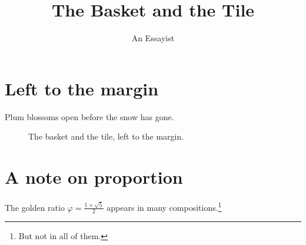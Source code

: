 \documentclass[11pt,a4paper]{article}
\title{The Basket and the Tile}
\author{An Essayist}
\date{}
\providecommand\KachoSprayCmd{}
\begin{document}
\maketitle
\section{Left to the margin}
Plum blossoms open before the snow has gone. \lipsum[1]
\begin{figure}[!htbp]
  \centering
  \KachoSprayCmd
  \caption{The basket and the tile, left to the margin.}
\end{figure}
\lipsum[2-3]
\section{A note on proportion}
The golden ratio $\varphi = \tfrac{1+\sqrt5}{2}$ appears in many
compositions.\footnote{But not in all of them.} \lipsum[4-6]
\end{document}
